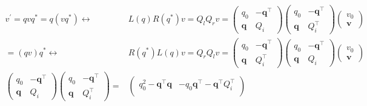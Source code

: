\documentclass[
]{book}
\theoremstyle{definition}
\theoremstyle{definition}
\theoremstyle{definition}
\theoremstyle{definition}
\theoremstyle{remark}
\begin{document}
\[
\begin{aligned}
v^{\prime}=qvq^{*}=q\left(vq^{*}\right)\leftrightarrow & L\left(q\right)R\left(q^{*}\right)v=Q_{{\scriptscriptstyle l}}Q_{{\scriptscriptstyle r}}v=\begin{pmatrix}q_{{\scriptscriptstyle 0}} & -\boldsymbol{q}^{\intercal}\\
\boldsymbol{q} & Q_{{\scriptscriptstyle i}}
\end{pmatrix}\begin{pmatrix}q_{{\scriptscriptstyle 0}} & -\boldsymbol{q}^{\intercal}\\
\boldsymbol{q} & Q_{{\scriptscriptstyle i}}^{\intercal}
\end{pmatrix}\begin{pmatrix}v_{{\scriptscriptstyle 0}}\\
\boldsymbol{v}
\end{pmatrix}\\
=\left(qv\right)q^{*}\leftrightarrow & R\left(q^{*}\right)L\left(q\right)v=Q_{{\scriptscriptstyle r}}Q_{{\scriptscriptstyle l}}v=\begin{pmatrix}q_{{\scriptscriptstyle 0}} & -\boldsymbol{q}^{\intercal}\\
\boldsymbol{q} & Q_{{\scriptscriptstyle i}}^{\intercal}
\end{pmatrix}\begin{pmatrix}q_{{\scriptscriptstyle 0}} & -\boldsymbol{q}^{\intercal}\\
\boldsymbol{q} & Q_{{\scriptscriptstyle i}}
\end{pmatrix}\begin{pmatrix}v_{{\scriptscriptstyle 0}}\\
\boldsymbol{v}
\end{pmatrix}\\
\begin{pmatrix}q_{{\scriptscriptstyle 0}} & -\boldsymbol{q}^{\intercal}\\
\boldsymbol{q} & Q_{{\scriptscriptstyle i}}
\end{pmatrix}\begin{pmatrix}q_{{\scriptscriptstyle 0}} & -\boldsymbol{q}^{\intercal}\\
\boldsymbol{q} & Q_{{\scriptscriptstyle i}}^{\intercal}
\end{pmatrix}= & \begin{pmatrix}q_{{\scriptscriptstyle 0}}^{2}-\boldsymbol{q}^{\intercal}\boldsymbol{q} & -q_{{\scriptscriptstyle 0}}\boldsymbol{q}^{\intercal}-\boldsymbol{q}^{\intercal}Q_{{\scriptscriptstyle i}}^{\intercal}\\

\end{pmatrix}
\end{aligned}\]
\end{document}
